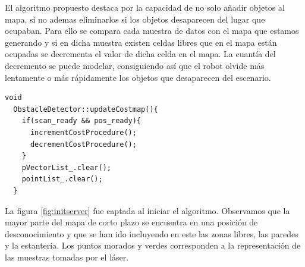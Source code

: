 El algoritmo propuesto destaca por la capacidad de no solo añadir objetos al mapa, si no ademas eliminarlos si los objetos desaparecen del lugar que ocupaban. Para ello se compara cada muestra de datos con el mapa que estamos generando y si en dicha muestra existen celdas libres que en el mapa están ocupadas se decrementa el valor de dicha celda en el mapa. La cuantía del decremento se puede modelar, consiguiendo así que el robot olvide más lentamente o más rápidamente los objetos que desaparecen del escenario.\\

\renewcommand{\lstlistingname}{Código}
\begin{lstlisting}[caption=Función que actualiza el mapa en cada iteración, label={lst:updatecostmap}]
  void
  ObstacleDetector::updateCostmap(){
    if(scan_ready && pos_ready){
      incrementCostProcedure();
      decrementCostProcedure();
    }
    pVectorList_.clear();
    pointList_.clear();
  }
\end{lstlisting}

La figura \ref{fig:initserver} fue captada al iniciar el algoritmo. Observamos que la mayor parte del mapa de corto plazo se encuentra en una posición de desconocimiento y que se han ido incluyendo en este las zonas libres, las paredes y la estantería. Los puntos morados y verdes corresponden a la representación de las muestras tomadas por el láser.

